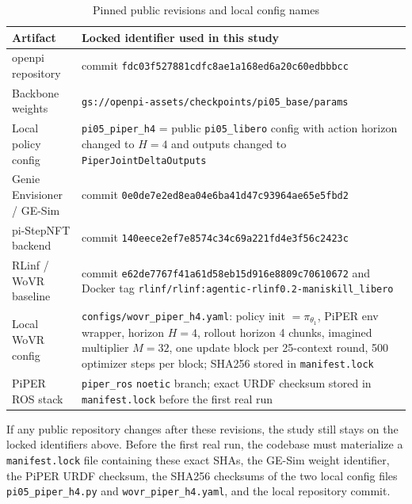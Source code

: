 \documentclass[10pt]{article}
\theoremstyle{plain}
\theoremstyle{definition}
\theoremstyle{remark}
\begin{document}
\begin{table}[H]
\centering
\small
\caption*{Pinned public revisions and local config names}
\begin{tabularx}{\linewidth}{@{}p{3.4cm}X@{}}
\toprule
Artifact & Locked identifier used in this study \\
\midrule
openpi repository & commit \texttt{fdc03f527881cdfc8ae1a168ed6a20c60edbbbcc} \\
Backbone weights & \texttt{gs://openpi-assets/checkpoints/pi05\_base/params} \\
Local policy config & \texttt{pi05\_piper\_h4} = public \texttt{pi05\_libero} config with action horizon changed to $H=4$ and outputs changed to \texttt{PiperJointDeltaOutputs} \\
Genie Envisioner / GE-Sim & commit \texttt{0e0de7e2ed8ea04e6ba41d47c93964ae65e5fbd2} \\
pi-StepNFT backend & commit \texttt{140eece2ef7e8574c34c69a221fd4e3f56c2423c} \\
RLinf / WoVR baseline & commit \texttt{e62de7767f41a61d58eb15d916e8809c70610672} and Docker tag \texttt{rlinf/rlinf:agentic-rlinf0.2-maniskill\_libero} \\
Local WoVR config & \texttt{configs/wovr\_piper\_h4.yaml}: policy init $=\pi_{\theta_1}$, PiPER env wrapper, horizon $H=4$, rollout horizon 4 chunks, imagined multiplier $M=32$, one update block per 25-context round, 500 optimizer steps per block; SHA256 stored in \texttt{manifest.lock} \\
PiPER ROS stack & \texttt{piper\_ros} \texttt{noetic} branch; exact URDF checksum stored in \texttt{manifest.lock} before the first real run \\
\bottomrule
\end{tabularx}
\end{table}

If any public repository changes after these revisions, the study still stays on the locked identifiers above. Before the first real run, the codebase must materialize a \texttt{manifest.lock} file containing these exact SHAs, the GE-Sim weight identifier, the PiPER URDF checksum, the SHA256 checksums of the two local config files \texttt{pi05\_piper\_h4.py} and \texttt{wovr\_piper\_h4.yaml}, and the local repository commit.
\end{document}
